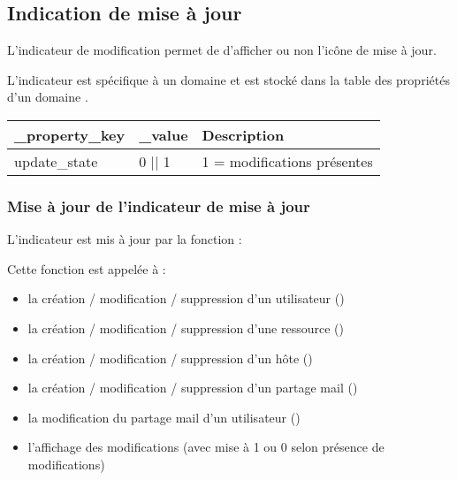 \subsection{Indication de mise à jour}

L'indicateur de modification permet de d'afficher ou non l'icône de mise à jour.

L'indicateur est spécifique à un domaine et est stocké dans la table des propriétés d'un domaine .\\

\begin{tabular}{|p{3cm}|p{3cm}|p{7cm}|}
\hline
\textbf{\_property\_key} & \textbf{\_value} & \textbf{Description}\\
\hline
update\_state & 0 || 1 & 1 = modifications présentes\\
\hline
\end{tabular}
\vspace{0,3cm}


\subsubsection{Mise à jour de l'indicateur de mise à jour}

L'indicateur est mis à jour par la fonction :\\

Cette fonction est appelée à :\\
\begin{itemize}
\item la création / modification / suppression d'un utilisateur (\user)
\item la création / modification / suppression d'une ressource (\resource)
\item la création / modification / suppression d'un hôte (\host)
\item la création / modification / suppression d'un partage mail (\mailshare)
\item la modification du partage mail d'un utilisateur (\mailbox)
\item l'affichage des modifications (avec mise à 1 ou 0 selon présence de modifications)
\end{itemize}


